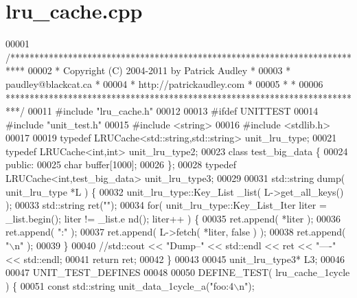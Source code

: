 \section{lru\_\-cache.cpp}

\begin{DoxyCode}
00001 \textcolor{comment}{/***************************************************************************}
00002 \textcolor{comment}{ *   Copyright (C) 2004-2011 by Patrick Audley                             *}
00003 \textcolor{comment}{ *   paudley@blackcat.ca                                                   *}
00004 \textcolor{comment}{ *   http://patrickaudley.com                                              *}
00005 \textcolor{comment}{ *                                                                         *}
00006 \textcolor{comment}{ ***************************************************************************/}
00011 \textcolor{preprocessor}{#include "lru_cache.h"}
00012 
00013 \textcolor{preprocessor}{#ifdef UNITTEST}
00014 \textcolor{preprocessor}{}\textcolor{preprocessor}{#include "unit_test.h"}
00015 \textcolor{preprocessor}{#include <string>}
00016 \textcolor{preprocessor}{#include <stdlib.h>}
00017 
00019 \textcolor{keyword}{typedef} LRUCache<std::string,std::string> unit_lru_type;
00021 \textcolor{keyword}{typedef} LRUCache<int,int> unit_lru_type2;
00023 \textcolor{keyword}{class }test\_big\_data \{
00024         \textcolor{keyword}{public}:
00025                 \textcolor{keywordtype}{char} buffer[1000];
00026 \};
00028 \textcolor{keyword}{typedef} LRUCache<int,test_big_data> unit_lru_type3;
00029 
00031 std::string dump( unit_lru_type *L ) \{
00032         unit_lru_type::Key_List \_list( L->get_all_keys() );
00033         std::string ret(\textcolor{stringliteral}{""});
00034         \textcolor{keywordflow}{for}( unit_lru_type::Key_List_Iter liter = \_list.begin(); liter != \_list.e
      nd(); liter++ ) \{
00035                 ret.append( *liter );
00036                 ret.append( \textcolor{stringliteral}{":"} );
00037                 ret.append( L->fetch( *liter, \textcolor{keyword}{false} ) );
00038                 ret.append( \textcolor{stringliteral}{"\(\backslash\)n"} );
00039         \}
00040         \textcolor{comment}{//std::cout << "Dump--" << std::endl << ret << "----" << std::endl;}
00041         \textcolor{keywordflow}{return} ret;
00042 \}
00043 
00045 unit_lru_type3* L3;
00046 
00047 UNIT_TEST_DEFINES
00048 
00050 DEFINE_TEST( lru\_cache\_1cycle ) \{
00051         \textcolor{keyword}{const} std::string unit\_data\_1cycle\_a(\textcolor{stringliteral}{"foo:4\(\backslash\)n"});

\end{DoxyCode}
